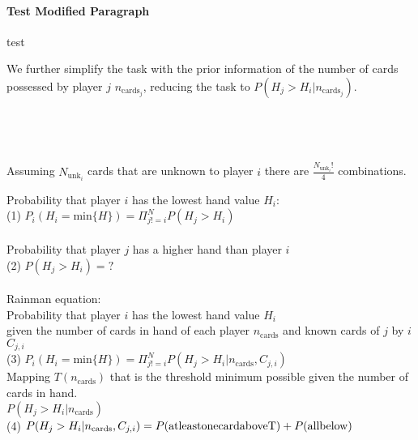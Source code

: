 \documentclass[10pt]{article}
\begin{document}
\paragraph{Test Modified Paragraph}
test




We further simplify the task with the prior 
information of the number of cards possessed by player $j$ $n_{\mathrm{cards}_j}$, reducing the task to $P(H_j>H_i| n_{\mathrm{cards}_j})$. 
\\ \\ \\ \\ \\

Assuming $N_{\mathrm{unk}_i}$ cards that are unknown to player $i$ there are $\frac{N_{\mathrm{unk}_i}!}{4}$ combinations.




Probability that player $i$ has the lowest hand value $H_i$:  \\
(1) $P_{i}(H_i = \mathrm{min}\{H\}) = \Pi_{j!=i}^{N} P(H_j > H_i)$
\\ \\
Probability that player $j$ has a higher hand than player $i$  \\
(2) $P(H_j>H_i) = ?$
\\ \\
Rainman equation:\\
Probability that player $i$ has the lowest hand value $H_i$\\ given the number of cards in hand of each player $n_{\mathrm{cards}}$ and known cards of $j$ by $i$ $C_{j,i}$
\\
(3) $P_{i}(H_i = \mathrm{min}\{H\}) = \Pi_{j!=i}^{N} P(H_j > H_i|n_{\mathrm{cards}}, C_{j,i})$
\\
Mapping $T(n_{\mathrm{cards} })$ that is the threshold minimum possible given the number of cards in hand.\\ $P(H_j > H_i|n_{\mathrm{cards}})$
\\
(4) $P(H_j > H_i|n_{\mathrm{cards}}, C_{j,i})=\\ P(\mathrm{at least one card above T}) + P(\mathrm{all below })$ 
\end{document}
